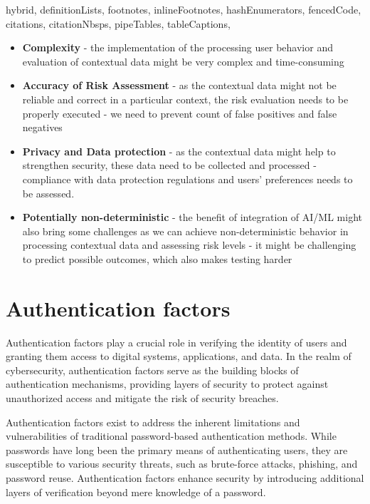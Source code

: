 \documentclass[
  digital,     %
  oneside,     %
  nosansbold,  %
  nocolorbold, %
  lof,         %
  lot,         %
]{fithesis4}
\begin{document}
\begin{markdown*}{%
  hybrid,
  definitionLists,
  footnotes,
  inlineFootnotes,
  hashEnumerators,
  fencedCode,
  citations,
  citationNbsps,
  pipeTables,
  tableCaptions,
}
\begin{itemize}
    \item \textbf{Complexity} - the implementation of the processing user behavior and evaluation of contextual data might be very complex and time-consuming  
    \item \textbf{Accuracy of Risk Assessment} - as the contextual data might not be reliable and correct in a particular context, the risk evaluation needs to be properly executed - we need to prevent count of false positives and false negatives 
    \item \textbf{Privacy and Data protection} - as the contextual data might help to strengthen security, these data need to be collected and processed - compliance with data protection regulations and users' preferences needs to be assessed.
    \item \textbf{Potentially non-deterministic} - the benefit of integration of AI/ML might also bring some challenges as we can achieve non-deterministic behavior in processing contextual data and assessing risk levels - it might be challenging to predict possible outcomes, which also makes testing harder\cite{intro-silverfort}\cite{intro-descope}\cite{intro-logintc}
    
\end{itemize}

\newpage
\section{Authentication factors}
Authentication factors play a crucial role in verifying the identity of users and granting them access to digital systems, applications, and data.
In the realm of cybersecurity, authentication factors serve as the building blocks of authentication mechanisms, providing layers of security to protect against unauthorized access and mitigate the risk of security breaches.

Authentication factors exist to address the inherent limitations and vulnerabilities of traditional password-based authentication methods.
While passwords have long been the primary means of authenticating users, they are susceptible to various security threats, such as brute-force attacks, phishing, and password reuse.
Authentication factors enhance security by introducing additional layers of verification beyond mere knowledge of a password.\cite{auth-factors-aratek}



\end{markdown*}
\end{document}
